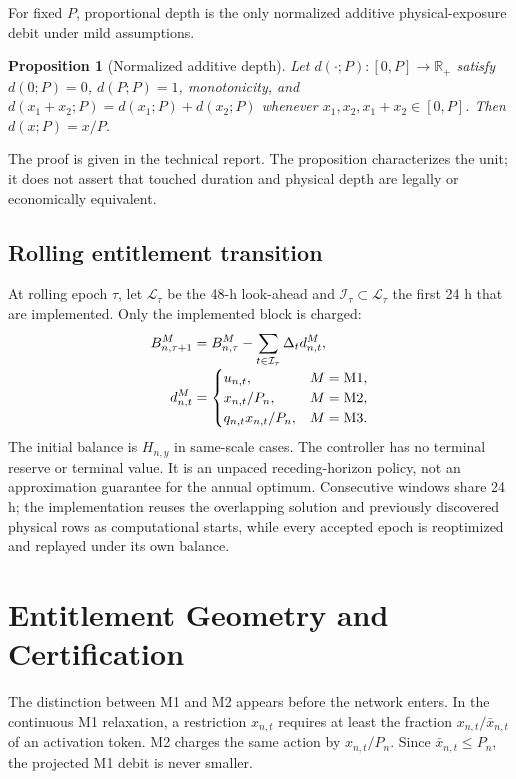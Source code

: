 \documentclass[10pt,journal]{IEEEtran}
\newtheorem{proposition}{Proposition}
\newcommand{\R}{\mathbb{R}}
\newcommand{\Mone}{\ensuremath{\mathrm{M1}}}
\newcommand{\Mtwo}{\ensuremath{\mathrm{M2}}}
\newcommand{\Mthree}{\ensuremath{\mathrm{M3}}}
\begin{document}
For fixed $P$, proportional depth is the only normalized additive physical-exposure debit under mild assumptions.

\begin{proposition}[Normalized additive depth]
\label{prop:m2_unique}
Let $d(\cdot;P):[0,P]\to\R_+$ satisfy $d(0;P)=0$, $d(P;P)=1$, monotonicity, and $d(x_1+x_2;P)=d(x_1;P)+d(x_2;P)$ whenever $x_1,x_2,x_1+x_2\in[0,P]$. Then $d(x;P)=x/P$.
\end{proposition}

The proof is given in the technical report. The proposition characterizes the unit; it does not assert that touched duration and physical depth are legally or economically equivalent.

\subsection{Rolling entitlement transition}

At rolling epoch $\tau$, let $\mathcal L_\tau$ be the 48-h look-ahead and $\mathcal I_\tau\subset\mathcal L_\tau$ the first 24 h that are implemented. Only the implemented block is charged:
\begin{align}
B_{n,\tau+1}^{M}
&=B_{n,\tau}^{M}
-\sum_{t\in\mathcal I_\tau}\Delta_t d_{n,t}^{M},
\label{eq:rolling}\\[-1mm]
d_{n,t}^{M}
&=
\begin{cases}
u_{n,t},&M=\Mone,\\
x_{n,t}/P_n,&M=\Mtwo,\\
q_{n,t}x_{n,t}/P_n,&M=\Mthree.
\end{cases}
\notag
\end{align}
The initial balance is $H_{n,y}$ in same-scale cases. The controller has no terminal reserve or terminal value. It is an unpaced receding-horizon policy, not an approximation guarantee for the annual optimum. Consecutive windows share 24 h; the implementation reuses the overlapping solution and previously discovered physical rows as computational starts, while every accepted epoch is reoptimized and replayed under its own balance.

\section{Entitlement Geometry and Certification}
\label{sec:geometry}

The distinction between M1 and M2 appears before the network enters. In the continuous M1 relaxation, a restriction $x_{n,t}$ requires at least the fraction $x_{n,t}/\bar x_{n,t}$ of an activation token. M2 charges the same action by $x_{n,t}/P_n$. Since $\bar x_{n,t}\leq P_n$, the projected M1 debit is never smaller.
\end{document}
